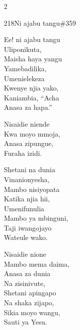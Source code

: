 \documentclass{article}
\begin{document}
\begin{multicols}{2}
\begin{hymn}{218}{Ni ajabu tangu}{\#359}
\begin{stanza}
Ee! ni ajabu tangu\\
Uliponikuta,\\
Maisha haya yangu\\
Yamebadilika,\\
Umenielekeza\\
Kwenye njia yako,\\
Kaniambia, ``Acha\\
Anasa za hapa.''
\end{stanza}
\begin{chorus}
Nisaidie niende\\
Kwa moyo mmoja,\\
Anasa zipungue,\\
Furaha izidi.
\end{chorus}
\begin{stanza}
Shetani na dunia\\
Vinanionyesha,\\
Mambo nisiyopata\\
Katika njia hii,\\
Umenifunulia\\
Mambo ya mbinguni,\\
Taji iwangojayo\\
Wateule wako.
\end{stanza}
\begin{stanza}
Nisaidie nione\\
Mambo mema daima,\\
Anasa za dunia\\
Na zisinivute,\\
Shetani apingapo\\
Na shaka zijapo,\\
Sikia moyo wangu,\\
Sauti ya Yesu.
\end{stanza}
\end{hymn}


\end{multicols}
\end{document}
